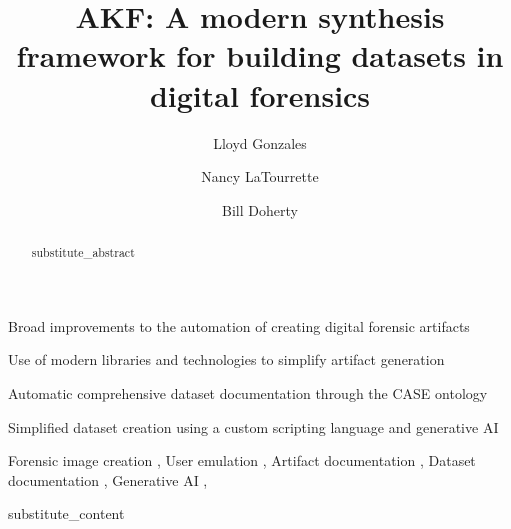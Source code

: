 \documentclass[preprint,12pt]{elsarticle}
\begin{document}
\begin{frontmatter}

\title{AKF: A modern synthesis framework for building datasets in digital forensics}

\author[unr]{Lloyd Gonzales}
\author[unr]{Nancy LaTourrette}
\author[unr]{Bill Doherty}

\begin{abstract}
{{substitute_abstract}}
\end{abstract}


\begin{highlights}
\item Broad improvements to the automation of creating digital forensic artifacts
\item Use of modern libraries and technologies to simplify artifact generation
\item Automatic comprehensive dataset documentation through the CASE ontology
\item Simplified dataset creation using a custom scripting language and generative AI
\end{highlights}
    
\begin{keyword}
Forensic image creation \sep
User emulation \sep
Artifact documentation \sep
Dataset documentation \sep
Generative AI \sep
\end{keyword}

\end{frontmatter}

{{substitute_content}}
\end{document}
